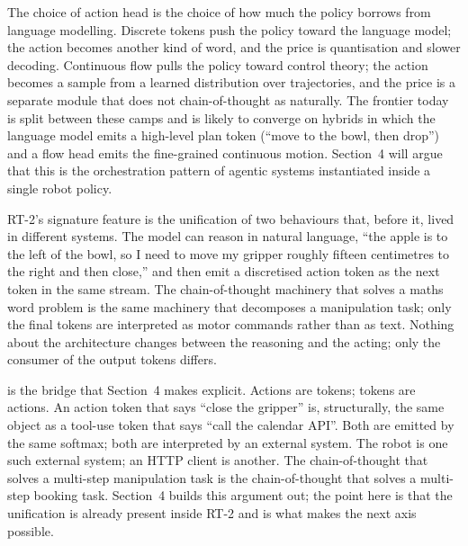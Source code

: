  The choice of action head is the choice of how much the policy borrows from language modelling. Discrete tokens push the policy toward the language model; the action becomes another kind of word, and the price is quantisation and slower decoding. Continuous flow pulls the policy toward control theory; the action becomes a sample from a learned distribution over trajectories, and the price is a separate module that does not chain-of-thought as naturally. The frontier today is split between these camps and is likely to converge on hybrids in which the language model emits a high-level plan token (``move to the bowl, then drop'') and a flow head emits the fine-grained continuous motion. Section~4 will argue that this is the orchestration pattern of agentic systems instantiated inside a single robot policy.

\vspace{2.5em}

 RT-2's signature feature is the unification of two behaviours that, before it, lived in different systems. The model can reason in natural language, ``the apple is to the left of the bowl, so I need to move my gripper roughly fifteen centimetres to the right and then close,'' and then emit a discretised action token as the next token in the same stream. The chain-of-thought machinery that solves a maths word problem is the same machinery that decomposes a manipulation task; only the final tokens are interpreted as motor commands rather than as text. Nothing about the architecture changes between the reasoning and the acting; only the consumer of the output tokens differs.


 is the bridge that Section~4 makes explicit. Actions are tokens; tokens are actions. An action token that says ``close the gripper'' is, structurally, the same object as a tool-use token that says ``call the calendar API''. Both are emitted by the same softmax; both are interpreted by an external system. The robot is one such external system; an HTTP client is another. The chain-of-thought that solves a multi-step manipulation task is the chain-of-thought that solves a multi-step booking task. Section~4 builds this argument out; the point here is that the unification is already present inside RT-2 and is what makes the next axis possible.

